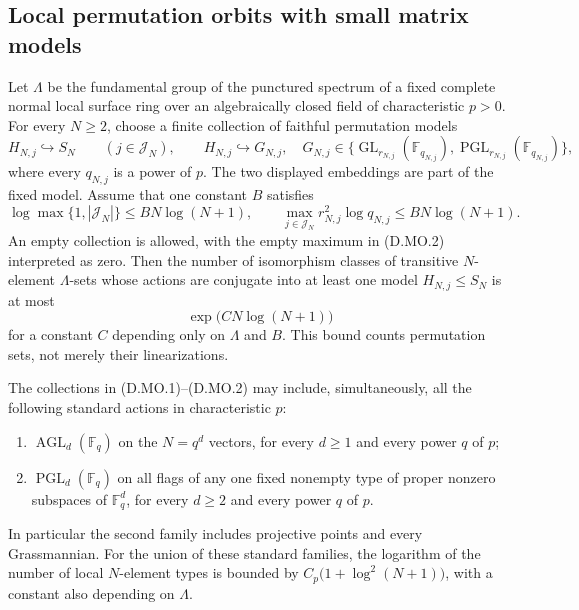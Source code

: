 \subsection{Local permutation orbits with small matrix models}

\begin{lemma}
\label{D:permutation-matrix-model-count}
Let $\Lambda$ be the fundamental group of the punctured spectrum of
a fixed complete normal local surface ring over an algebraically
closed field of characteristic $p>0$. For every $N\ge2$, choose
a finite collection of faithful permutation models
\[
 H_{N,j}\hookrightarrow S_N\qquad(j\in\mathcal J_N),
 \qquad
 H_{N,j}\hookrightarrow G_{N,j},
 \quad
 G_{N,j}\in\{\operatorname{GL}_{r_{N,j}}(\mathbb F_{q_{N,j}}),
              \operatorname{PGL}_{r_{N,j}}(\mathbb F_{q_{N,j}})\},
                                                        \tag{D.MO.1}
\]
where every $q_{N,j}$ is a power of $p$. The two displayed
embeddings are part of the fixed model. Assume that one constant
$B$ satisfies
\[
 \log\max\{1,|\mathcal J_N|\}\le B N\log(N+1),\qquad
 \max_{j\in\mathcal J_N}r_{N,j}^{2}\log q_{N,j}
                              \le B N\log(N+1).          \tag{D.MO.2}
\]
An empty collection is allowed, with the empty maximum in
(D.MO.2) interpreted as zero. Then the number of isomorphism
classes of transitive $N$-element $\Lambda$-sets whose actions are
conjugate into at least one model $H_{N,j}\le S_N$ is at most
\[
                         \exp\bigl(C N\log(N+1)\bigr)   \tag{D.MO.3}
\]
for a constant $C$ depending only on $\Lambda$ and $B$.
This bound counts permutation sets, not merely their linearizations.

The collections in (D.MO.1)--(D.MO.2) may include, simultaneously,
all the following standard actions in characteristic $p$:
\begin{enumerate}
\item $\operatorname{AGL}_d(\mathbb F_q)$ on the $N=q^d$ vectors,
      for every $d\ge1$ and every power $q$ of $p$;
\item $\operatorname{PGL}_d(\mathbb F_q)$ on all flags of any one
      fixed nonempty type of proper nonzero subspaces of
      $\mathbb F_q^d$, for every $d\ge2$ and every power $q$ of $p$.
\end{enumerate}
In particular the second family includes projective points and
every Grassmannian. For the union of these standard families,
the logarithm of the number of local $N$-element types is bounded
by $C_p\bigl(1+\log^2(N+1)\bigr)$, with a constant also depending
on $\Lambda$.
\end{lemma}

